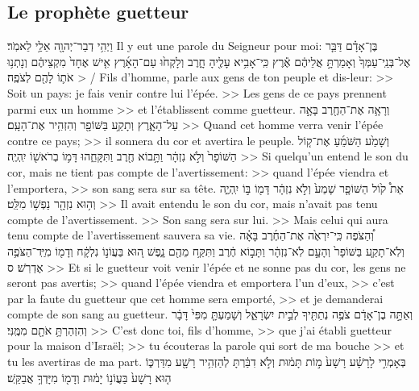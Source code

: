 \begin{paracol}[1]
  \subsection*{Le prophète guetteur}
  \verset
  {וַיְהִ֥י דְבַר־יְהוָ֖ה אֵלַ֥י לֵאמֹֽר׃}
  {Il y eut une parole du Seigneur pour moi:}
  \verset
  {בֶּן־אָדָ֗ם דַּבֵּ֤ר אֶל־בְּנֵֽי־עַמְּךָ֙ וְאָמַרְתָּ֣ אֲלֵיהֶ֔ם
    אֶ֕רֶץ כִּֽי־אָבִ֥יא עָלֶ֖יהָ חָ֑רֶב
    וְלָקְח֙וּ עַם־הָאָ֜רֶץ אִ֤ישׁ אֶחָד֙ מִקְצֵיהֶ֔ם
    וְנָתְנ֥וּ אֹת֛וֹ לָהֶ֖ם לְצֹפֶֽה׃}
  {> / Fils d’homme, parle aux gens de ton peuple et dis-leur:
    >> Soit un pays: je fais venir contre lui l’épée.
    >> Les gens de ce pays prennent parmi eux un homme
    >> et l’établissent comme guetteur.}
  \verset
  {וְרָאָ֥ה אֶת־הַחֶ֖רֶב בָּאָ֣ה עַל־הָאָ֑רֶץ
    וְתָקַ֥ע בַּשּׁוֹפָ֖ר וְהִזְהִ֥יר אֶת־הָעָֽם׃}
  {>> Quand cet homme verra venir l’épée contre ce pays;
    >> il sonnera du cor et avertira le peuple.}
  \verset
  {וְשָׁמַ֙ע הַשֹּׁמֵ֜עַ אֶת־ק֤וֹל הַשּׁוֹפָר֙ וְלֹ֣א נִזְהָ֔ר
    וַתָּ֥בוֹא חֶ֖רֶב וַתִּקָּחֵ֑הוּ
    דָּמ֥וֹ בְרֹאשׁ֖וֹ יִֽהְיֶֽה׃}
  {>> Si quelqu’un entend le son du cor, mais ne tient pas compte de l’avertissement:
    >> quand l’épée viendra et l’emportera,
    >> son sang sera sur sa tête.}
  \verset
  {אֵת֩ ק֙וֹל הַשּׁוֹפָ֤ר שָׁמַע֙ וְלֹ֣א נִזְהָ֔ר
    דָּמ֖וֹ בּ֣וֹ יִֽהְיֶ֑ה
    וְה֥וּא נִזְהָ֖ר נַפְשׁ֥וֹ מִלֵּֽט׃}
  {>> Il avait entendu le son du cor, mais n’avait pas tenu compte de l’avertissement.
    >> Son sang sera sur lui.
    >> Mais celui qui aura tenu compte de l’avertissement sauvera sa vie.}
  \verset
  {וְ֠הַצֹּפֶה כִּֽי־יִרְאֶ֙ה אֶת־הַחֶ֜רֶב בָּאָ֗ה וְלֹֽא־תָקַ֤ע בַּשּׁוֹפָר֙ וְהָעָ֣ם לֹֽא־נִזְהָ֔ר
    וַתָּב֣וֹא חֶ֔רֶב וַתִּקַּ֥ח מֵהֶ֖ם נָ֑פֶשׁ
    ה֚וּא בַּעֲוֹנ֣וֹ נִלְקָ֔ח
    וְדָמ֖וֹ מִיַּֽד־הַצֹּפֶ֥ה אֶדְרֹֽשׁ׃ ס}
  {>> Et si le guetteur voit venir l’épée et ne sonne pas du cor, les gens ne seront pas avertis;
    >> quand l’épée viendra et emportera l’un d’eux,
    >> c’est par la faute du guetteur que cet homme sera emporté,
    >> et je demanderai compte de son sang au guetteur.}
  \parSpace
  \verset
  {וְאַתָּ֣ה בֶן־אָדָ֔ם
    צֹפֶ֥ה נְתַתִּ֖יךָ לְבֵ֣ית יִשְׂרָאֵ֑ל
    וְשָׁמַעְתָּ֤ מִפִּי֙ דָּבָ֔ר
    וְהִזְהַרְתָּ֥ אֹתָ֖ם מִמֶּֽנִּי׃}
  {>> C’est donc toi, fils d’homme,
    >> que j’ai établi guetteur pour la maison d’Israël;
    >> tu écouteras la parole qui sort de ma bouche
    >> et tu les avertiras de ma part.}
  \verset
  {בְּאָמְרִ֣י לָרָשָׁ֗ע
    רָשָׁע֙ מ֣וֹת תָּמ֔וּת
    וְלֹ֣א דִבַּ֔רְתָּ לְהַזְהִ֥יר רָשָׁ֖ע מִדַּרְכּ֑וֹ
    ה֤וּא רָשָׁע֙ בַּעֲוֹנ֣וֹ יָמ֔וּת
    וְדָמ֖וֹ מִיָּדְךָ֥ אֲבַקֵּֽשׁ׃}

\end{paracol}
